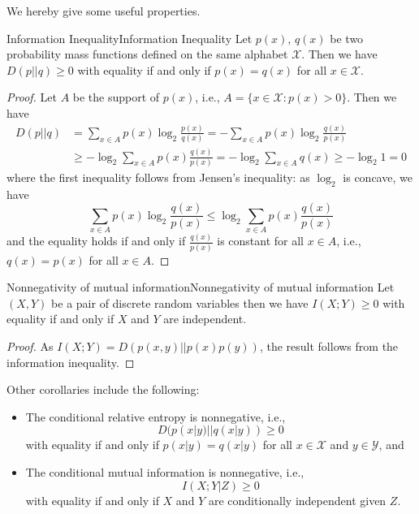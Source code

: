 \documentclass[../main.tex]{subfiles}
\begin{document}
We hereby give some useful properties.
\begin{theorem}{Information Inequality}{Information Inequality}
  Let $p(x)$, $q(x)$ be two probability mass functions defined on the same alphabet $\mathcal{X}$. Then we have $D(p||q) \geq 0$ with equality if and only if $p(x) = q(x)$ for all $x \in \mathcal{X}$.
\end{theorem}
\begin{proof}
  Let $A$ be the support of $p(x)$, i.e., $A = \{x \in \mathcal{X} : p(x) > 0\}$. Then we have
  \begin{equation*}
    \begin{aligned}
      D(p||q) &= \sum_{x \in A} p(x) \log_2 \frac{p(x)}{q(x)} = -\sum_{x \in A} p(x) \log_2 \frac{q(x)}{p(x)}\\
      &\geq -\log_2 \sum_{x \in A} p(x) \frac{q(x)}{p(x)} = -\log_2 \sum_{x \in A} q(x) \geq -\log_2 1 = 0
    \end{aligned}
  \end{equation*}
  where the first inequality follows from Jensen's inequality: as $\log_2$ is concave, we have
  \begin{equation*}
    \sum_{x \in A} p(x) \log_2 \frac{q(x)}{p(x)} \leq \log_2 \sum_{x \in A} p(x) \frac{q(x)}{p(x)}
  \end{equation*}
  and the equality holds if and only if $\frac{q(x)}{p(x)}$ is constant for all $x \in A$, i.e., $q(x) = p(x)$ for all $x \in A$.
\end{proof}

\begin{corollary}{Nonnegativity of mutual information}{Nonnegativity of mutual information}
  Let $(X,Y)$ be a pair of discrete random variables then we have $I(X;Y) \geq 0$ with equality if and only if $X$ and $Y$ are independent.
\end{corollary}
\begin{proof}
  As $I(X;Y) = D(p(x,y)||p(x)p(y))$, the result follows from the information inequality.
\end{proof}

Other corollaries include the following:
\begin{itemize}
  \item The conditional relative entropy is nonnegative, i.e.,
    \begin{equation}
      D(p(x|y)||q(x|y)) \geq 0
    \end{equation}
    with equality if and only if $p(x|y) = q(x|y)$ for all $x \in \mathcal{X}$ and $y \in \mathcal{Y}$, and
  \item The conditional mutual information is nonnegative, i.e.,
    \begin{equation}
      I(X;Y|Z) \geq 0
    \end{equation}
    with equality if and only if $X$ and $Y$ are conditionally independent given $Z$.
\end{itemize}
\end{document}
